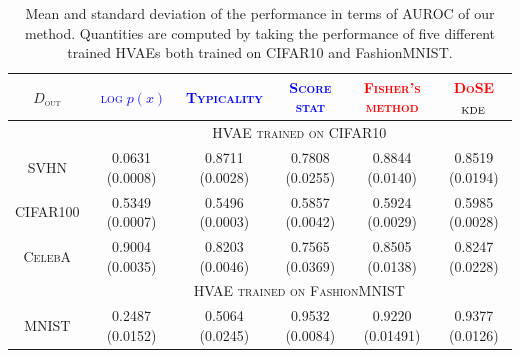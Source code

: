 {\begin{table}[tb]
    \caption[Mean and standard deviation of the performance in terms of AUROC of combined statistics for different HVAE models.]{Mean and standard deviation of the performance in terms of AUROC of our method. Quantities are computed by taking the performance of five different trained HVAEs both trained on CIFAR10 and FashionMNIST.}
        \centering
        \scriptsize
        \begin{tabular}{cccccc}
            \toprule
            \textsc{$D_{\text{out}}$}  & \textcolor{blue}{\textsc{$\log p(x)$}} & \textcolor{blue}{\textsc{Typicality}} & \textcolor{blue}{\textsc{Score stat}} & \textcolor{red}{\textsc{Fisher's method}} & \textcolor{red}{\textsc{DoSE$_{\textup{KDE}}$}}  \\
            \midrule
            &\multicolumn{5}{c}{\textsc{HVAE trained on CIFAR10}} \\
            \cmidrule{2-6}
            \textsc{SVHN} & 0.0631 (0.0008) & 0.8711 (0.0028)  & 0.7808 (0.0255) & 0.8844 (0.0140)  & 0.8519 (0.0194)\\
            \textsc{CIFAR100} & 0.5349 (0.0007) & 0.5496 (0.0003)  & 0.5857 (0.0042) & 0.5924 (0.0029)  & 0.5985 (0.0028)\\
            \textsc{CelebA} & 0.9004 (0.0035) & 0.8203 (0.0046) & 0.7565 (0.0369) & 0.8505 (0.0138) & 0.8247 (0.0228)\\
            \cmidrule{2-6}
            &\multicolumn{5}{c}{\textsc{HVAE trained on FashionMNIST}} \\
            \cmidrule{2-6}%
            \textsc{MNIST} & 0.2487 (0.0152) & 0.5064 (0.0245) & 0.9532 (0.0084) & 0.9220 (0.01491) & 0.9377 (0.0126)\\
            \bottomrule%
    \end{tabular}
    \label{table:consistency_results}
\end{table}


}
